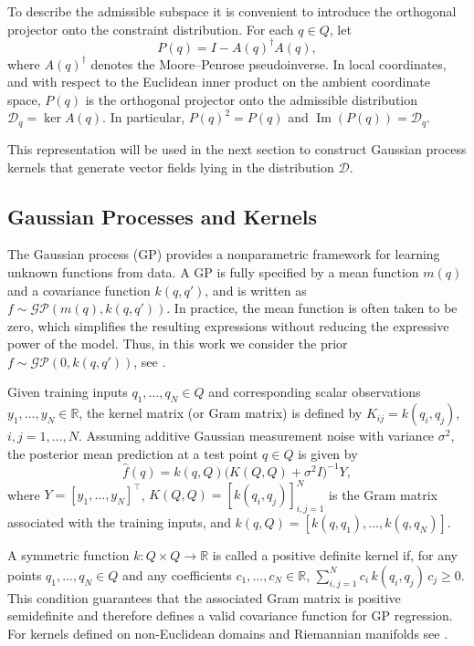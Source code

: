 \documentclass[letterpaper, 10 pt, conference]{ieeeconf}
\newcommand{\D}{\mathcal{D}}
\begin{document}
To describe the admissible subspace it is convenient to introduce the orthogonal projector onto the constraint distribution. 
For each $q\in Q$, let
\begin{equation}
P(q)=I-A(q)^\dagger A(q),
\label{eq:projector}
\end{equation}
where $A(q)^\dagger$ denotes the Moore--Penrose pseudoinverse. In local coordinates, and with respect to the Euclidean inner product on the ambient coordinate space, $P(q)$ is the orthogonal projector onto the admissible distribution
$\D_q=\ker A(q)$. In particular, $P(q)^2=P(q)$ and $\operatorname{Im}(P(q))=\D_q$.


This representation will be used in the next section to construct Gaussian process kernels that generate vector fields lying in the distribution $\mathcal{D}$.


\subsection{Gaussian Processes and Kernels}\label{sec:gp}
The Gaussian process (GP) provides a nonparametric framework for learning unknown functions from data. A GP is fully specified by a mean function $m(q)$ and a covariance function $k(q,q')$, and is written as $f \sim \mathcal{GP}(m(q),k(q,q'))$. In practice, the mean function is often taken to be zero, which simplifies the resulting expressions without reducing the expressive power of the model. Thus, in this work we consider the prior $f \sim \mathcal{GP}(0,k(q,q'))$, see \cite{rasmussen2006gaussian}.


Given training inputs $q_1,\dots,q_N \in Q$ and corresponding scalar observations $y_1,\dots,y_N \in \mathbb{R}$, the kernel matrix (or Gram matrix) is defined by
$K_{ij}=k(q_i,q_j)$, $i,j=1,\dots,N$. Assuming additive Gaussian measurement noise with variance $\sigma^2$, the posterior mean prediction at a test point $q\in Q$ is given by 
\begin{equation}
\hat f(q)=k(q,Q)\bigl(K(Q,Q)+\sigma^2 I\bigr)^{-1}Y,
\end{equation}
where $Y=[y_1,\dots,y_N]^\top$, $K(Q,Q)=[k(q_i,q_j)]_{i,j=1}^N$ is the Gram matrix associated with the training inputs, and $k(q,Q)=[k(q,q_1),\dots,k(q,q_N)]$.


A symmetric function $k\colon Q\times Q\to\mathbb{R}$ is called a positive definite kernel if, for any points $q_1,\dots,q_N\in Q$ and any coefficients $c_1,\dots,c_N\in\mathbb{R}$, $\displaystyle{\sum_{i,j=1}^N c_i\, k(q_i,q_j)\, c_j \ge 0}$. This condition guarantees that the associated Gram matrix is positive semidefinite and therefore defines a valid covariance function for GP regression. For kernels defined on non-Euclidean domains and Riemannian manifolds see \cite{Jayasumana2015,Borovitskiy2020}.
\end{document}
